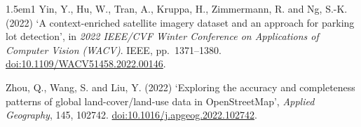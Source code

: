 \begin{hangparas}{1.5em}{1}
Yin, Y., Hu, W., Tran, A., Kruppa, H., Zimmermann, R. and Ng, S.-K. (2022) `A context-enriched satellite imagery dataset and an approach for parking lot detection', in \emph{2022 IEEE/CVF Winter Conference on Applications of Computer Vision (WACV)}. IEEE, pp.~1371--1380. \url{doi:10.1109/WACV51458.2022.00146}.

Zhou, Q., Wang, S. and Liu, Y. (2022) `Exploring the accuracy and completeness patterns of global land-cover/land-use data in OpenStreetMap', \emph{Applied Geography}, 145, 102742. \url{doi:10.1016/j.apgeog.2022.102742}.

\end{hangparas}